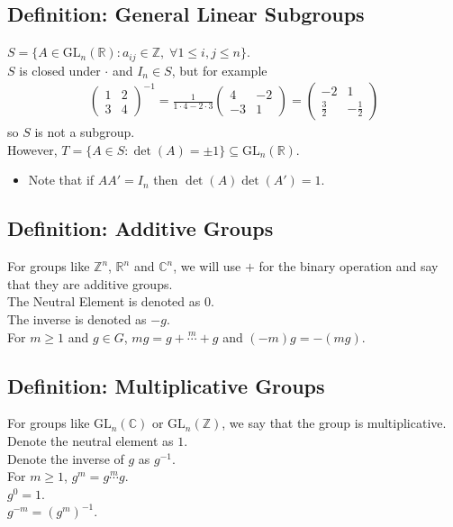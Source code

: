 \documentclass[11pt]{article}
\newcommand{\0}{\emptyset}
\newcommand{\Z}{\mathbb{Z}}
\newcommand{\R}{\mathbb{R}}
\newcommand{\C}{\mathbb{C}}
\begin{document}
\subsection*{Definition: General Linear Subgroups}
\label{sec:orge4a7974}
\(S=\{A\in\text{GL}_{n}(\R):a_{ij}\in\Z,\;\forall 1\leq i,j\leq n\}\).\\[0pt]
\(S\) is closed under \(\cdot\) and \(I_{n}\in S\), but for example\\[0pt]
\begin{align*}
  \begin{pmatrix}
    1 & 2 \\
    3 & 4
  \end{pmatrix}^{-1}
  = \frac{1}{1\cdot4-2\cdot3}
  \begin{pmatrix}
    4 & -2 \\
    -3 & 1
  \end{pmatrix}
  =
  \begin{pmatrix}
    -2 & 1 \\
    \frac{3}{2} & -\frac{1}{2}
  \end{pmatrix}
\end{align*}
so \(S\) is not a subgroup.\\[0pt]
However, \(T=\{A\in S:\det(A)=\pm1\} \subseteq \text{GL}_{n}(\R)\).\\[0pt]
\begin{itemize}
\item Note that if \(AA'=I_{n}\) then \(\det(A)\det(A')=1\).\\[0pt]
\end{itemize}
\subsection*{Definition: Additive Groups}
\label{sec:org23320d1}
For groups like \(\Z^{n}\), \(\R^{n}\) and \(\C^{n}\), we will use \(+\) for the binary operation and say that they are additive groups.\\[0pt]
The Neutral Element is denoted as \(0\).\\[0pt]
The inverse is denoted as \(-g\).\\[0pt]
For \(m\geq 1\) and \(g\in G\), \(mg=g+\overset{m}{\cdots}+g\) and \((-m)g=-(mg)\).\\[0pt]
\subsection*{Definition: Multiplicative Groups}
\label{sec:orgcace18a}
For groups like \(\text{GL}_{n}(\C)\) or \(\text{GL}_{n}(\Z)\), we say that the group is multiplicative.\\[0pt]
Denote the neutral element as \(1\).\\[0pt]
Denote the inverse of \(g\) as \(g^{-1}\).\\[0pt]
For \(m\geq1\), \(g^{m}=g\overset{m}{\cdots}g\).\\[0pt]
\(g^{0}=1\).\\[0pt]
\(g^{-m}=(g^{m})^{-1}\).\\[0pt]
\end{document}
